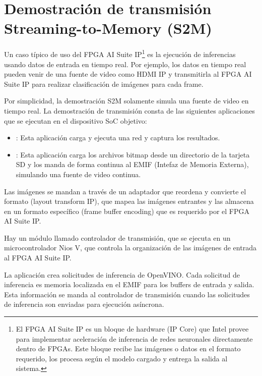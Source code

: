 \section{Demostraci\'on de transmisi\'on Streaming-to-Memory (S2M)}

    Un caso t\'ipico de uso del FPGA AI Suite IP\footnote{El FPGA AI Suite IP es un bloque de hardware (IP Core) que Intel provee para implementar aceleraci\'on de inferencia de redes neuronales directamente dentro de FPGAs. Este bloque recibe las im\'agenes o datos en el formato requerido, los procesa seg\'un el modelo cargado y entrega la salida al sistema.} es la ejecuci\'on de inferencias usando datos de entrada en tiempo real. Por ejemplo, los datos en tiempo real pueden venir de una fuente de video como HDMI IP y transmitirla al FPGA AI Suite IP para realizar clasificaci\'on de im\'agenes para cada frame.

    Por simplicidad, la demostraci\'on S2M solamente simula una fuente de video en tiempo real. La demostraci\'on de transmisi\'on consta de las siguientes aplicaciones que se ejecutan en el dispositivo SoC objetivo:

    \begin{itemize}
        \item {}: Esta aplicaci\'on carga y ejecuta una red y captura los resultados.
        \item {}: Esta aplicaci\'on carga los archivos bitmap desde un directorio de la tarjeta SD y los manda de forma continua al EMIF (Intefaz de Memoria Externa), simulando una fuente de video continua.
    \end{itemize}

    Las im\'agenes se mandan a trav\'es de un adaptador que reordena y convierte el formato (layout transform IP), que mapea las im\'agenes entrantes y las almacena en un formato espec\'ifico (frame buffer encoding) que es requerido por el FPGA AI Suite IP.

    Hay un m\'odulo llamado controlador de transmisi\'on, que se ejecuta en un microcontrolador Nios V, que controla la organizaci\'on de las im\'agenes de entrada al FPGA AI Suite IP.

    La aplicaci\'on  crea solicitudes de inferencia de OpenVINO. Cada solicitud de inferencia es memoria localizada en el EMIF para los buffers de entrada y salida. Esta informaci\'on se manda al controlador de transmisi\'on cuando las solicitudes de inferencia son enviadas para ejecuci\'on as\'incrona. 

